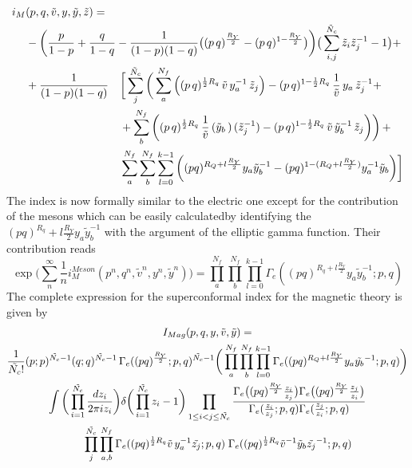 \begin{equation}
\begin{aligned}
 i_M &(p,q, \tilde v, y,\tilde y ,\tilde z) = \\
& -\bigg({p \over 1-p}+{q \over 1-q} -{1 \over (1-p)(1-q)} \big((p\,q)^{\frac{R_Y}{2}}- (p\,q)^{1-\frac{R_Y}{2}}\big)
\bigg) \big( \sum_{i,j}^{\tilde N_c} \tilde z_i \tilde z_j^{-1} -1\big ) + \\
&
\begin{aligned}
& +{1\over (1-p)(1-q)} && \bigg[ \sum_j^{\tilde N_c} \bigg( \sum_a^{N_f}\left(  (p\,q)^{{1 \over 2 } R_q} \,\tilde v \, y_a^{-1}\, \tilde z_j\right) 
-  (p\,q)^{1- {1\over 2}R_q} \, {1 \over \tilde v}\, y_a\,
\tilde z_j^{-1} + \\
&  &&+ \sum_b^{N_f} \left( (p\,q)^{{1 \over 2 } R_q}\, {1\over \tilde v}\,
({\tilde y_b}\,) \,
(\tilde z_j^{-1})
- (p\,q)^{1-  {1\over 2}R_q} \, \tilde v \,
{\tilde y_b}^{-1} \,
\tilde z_j \bigg) \right) + \\
 & &&\sum_a^{N_f} \sum_b^{N_f} \sum_{l=0}^{k-1}   \bigg(  (pq)^{ R_Q + l \frac{R_Y}{2}   } y_a \tilde y_b^{-1}   - (pq)^{1 -( R_Q + l \frac{R_Y}{2}  )}
y_a^{-1}  {\tilde y_b}  \bigg) \bigg] 
\end{aligned}
\end{aligned}
\end{equation}
The index is now formally similar to the electric one except for the contribution of the mesons which can be easily calculatedby identifying the $(pq)^{R_q} + l \frac{R_Y}{2} y_a \tilde{y}_b^{-1}$ with the argument of the elliptic gamma function.
Their contribution reads
\begin{equation}
 \exp \bigg( \sum_{n}^{\infty} \frac{1}{n} i_M^{Meson} (p^n,q^n, \tilde v^n, y^n,\tilde {y}^n) \bigg) = 
\prod_a^{N_f} \prod_b^{N_f}  \prod_{l=0}^{k-1} \Gamma_e ( (pq)^{R_q + l \frac{R_Y}{2}} y_a \tilde{y}_b^{-1} ; p ,q)
\end{equation}
The complete expression for the superconformal index for the magnetic theory is given by
\begin{multline}
I_{Mag} ( p,q,y,\tilde v,\tilde y) = \\
 { 1 \over \tilde{N_c} !} (p;p)^{\tilde{N_c}-1} ( q;q)^{\tilde{N_c}-1} \, 
 \Gamma_e( (pq)^\frac{R_Y}{2};p,q)^{\tilde{N_c}-1} \bigg( \prod_a^{N_f} \prod_b^{N_f}  \prod_{l=0}^{k-1} \Gamma_e ( (pq)^{R_Q + l \frac{R_Y}{2}} y_a \tilde{y_b}^{-1}; p ,q) \bigg) \\
\int \bigg( \prod_{i=1}^{ \tilde{N_c }} { d z_i \over { 2 \pi i z_i} } \bigg) \delta \bigg( \prod_{i=1}^{\tilde{N_c}} z_i - 1 \bigg)
\prod_{ 1 \leq i < j \leq \tilde{N_c}} \frac{ \Gamma_e \big( (pq)^\frac{R_Y}{2} {z_i \over z_j} \big) \Gamma_e \big( (pq)^\frac{R_Y}{2} {z_j \over z_i} \big) }{ \Gamma_e( {z_i \over z_j};p,q) \Gamma_e({z_j \over z_i}; p,q)} \\
  \qquad \prod_{ j}^{\tilde{N_c}} \prod_{ a,b}^{N_f} \Gamma_e ( (pq)^{{1 \over 2 } R_q} \tilde{v}\,  y_a^{-1} \tilde{z_j} ; p,q)
\; \Gamma_e ( (pq)^{{1 \over 2 } R_q} \tilde{v}^{-1} \tilde {y}_b \tilde{z_j}^{-1} ; p,q)
\end{multline}


